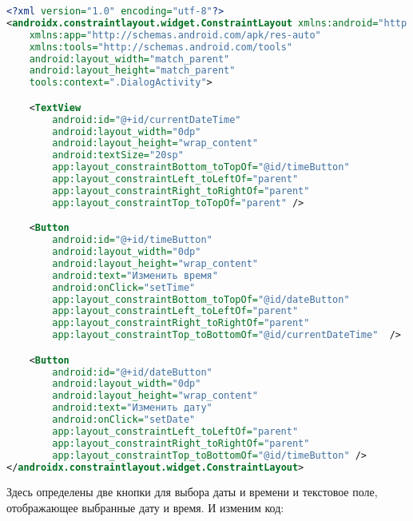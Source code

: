 \begin{lstlisting}[language=XML
	, label=lst:
	]
<?xml version="1.0" encoding="utf-8"?>
<androidx.constraintlayout.widget.ConstraintLayout xmlns:android="http://schemas.android.com/apk/res/android"
    xmlns:app="http://schemas.android.com/apk/res-auto"
    xmlns:tools="http://schemas.android.com/tools"
    android:layout_width="match_parent"
    android:layout_height="match_parent"
    tools:context=".DialogActivity">

    <TextView
        android:id="@+id/currentDateTime"
        android:layout_width="0dp"
        android:layout_height="wrap_content"
        android:textSize="20sp"
        app:layout_constraintBottom_toTopOf="@id/timeButton"
        app:layout_constraintLeft_toLeftOf="parent"
        app:layout_constraintRight_toRightOf="parent"
        app:layout_constraintTop_toTopOf="parent" />

    <Button
        android:id="@+id/timeButton"
        android:layout_width="0dp"
        android:layout_height="wrap_content"
        android:text="Изменить время"
        android:onClick="setTime"
        app:layout_constraintBottom_toTopOf="@id/dateButton"
        app:layout_constraintLeft_toLeftOf="parent"
        app:layout_constraintRight_toRightOf="parent"
        app:layout_constraintTop_toBottomOf="@id/currentDateTime"  />

    <Button
        android:id="@+id/dateButton"
        android:layout_width="0dp"
        android:layout_height="wrap_content"
        android:text="Изменить дату"
        android:onClick="setDate"
        app:layout_constraintLeft_toLeftOf="parent"
        app:layout_constraintRight_toRightOf="parent"
        app:layout_constraintTop_toBottomOf="@id/timeButton" />
</androidx.constraintlayout.widget.ConstraintLayout>
\end{lstlisting}

Здесь определены две кнопки для выбора даты и времени и текстовое поле,
отображающее выбранные дату и время. И изменим код:

